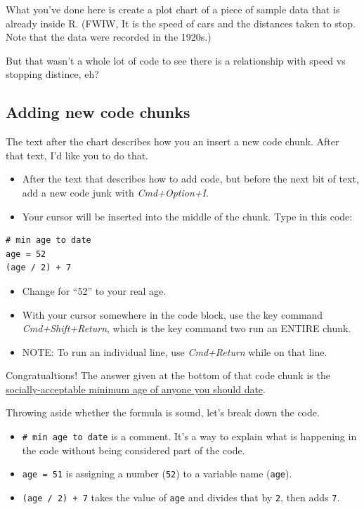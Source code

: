 \documentclass[]{book}
\providecommand{\tightlist}{%
  \setlength{\itemsep}{0pt}\setlength{\parskip}{0pt}}
\begin{document}
What you've done here is create a plot chart of a piece of sample data
that is already inside R. (FWIW, It is the speed of cars and the
distances taken to stop. Note that the data were recorded in the 1920s.)

But that wasn't a whole lot of code to see there is a relationship with
speed vs stopping distince, eh?

\subsection{Adding new code chunks}\label{adding-new-code-chunks}

The text after the chart describes how you an insert a new code chunk.
After that text, I'd like you to do that.

\begin{itemize}
\tightlist
\item
  After the text that describes how to add code, but before the next bit
  of text, add a new code junk with \emph{Cmd+Option+I}.
\item
  Your cursor will be inserted into the middle of the chunk. Type in
  this code:
\end{itemize}

\begin{verbatim}
# min age to date
age = 52
(age / 2) + 7
\end{verbatim}

\begin{itemize}
\tightlist
\item
  Change for ``52'' to your real age.
\item
  With your cursor somewhere in the code block, use the key command
  \emph{Cmd+Shift+Return}, which is the key command two run an ENTIRE
  chunk.
\item
  NOTE: To run an individual line, use \emph{Cmd+Return} while on that
  line.
\end{itemize}

Congratualtions! The answer given at the bottom of that code chunk is
the
\href{https://www.psychologytoday.com/us/blog/meet-catch-and-keep/201405/who-is-too-young-or-too-old-you-date}{socially-acceptable
minimum age of anyone you should date}.

Throwing aside whether the formula is sound, let's break down the code.

\begin{itemize}
\tightlist
\item
  \texttt{\#\ min\ age\ to\ date} is a comment. It's a way to explain
  what is happening in the code without being considered part of the
  code.
\item
  \texttt{age\ =\ 51} is assigning a number (\texttt{52}) to a variable
  name (\texttt{age}).
\item
  \texttt{(age\ /\ 2)\ +\ 7} takes the value of \texttt{age} and divides
  that by \texttt{2}, then adds \texttt{7}.
\end{itemize}
\end{document}
